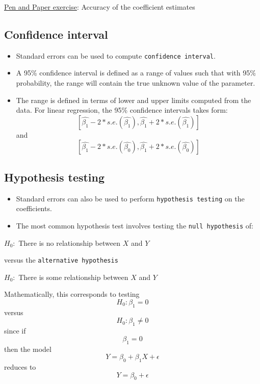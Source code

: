 \documentclass[]{article}
\providecommand{\tightlist}{%
  \setlength{\itemsep}{0pt}\setlength{\parskip}{0pt}}
\begin{document}
\href{pen-and-paper-plasma-volume.pdf}{Pen and Paper exercise}: Accuracy
of the coefficient estimates

\hypertarget{confidence-interval}{%
\subsection{Confidence interval}\label{confidence-interval}}

\begin{itemize}
\tightlist
\item
  Standard errors can be used to compute \texttt{confidence\ interval}.
\item
  A 95\% confidence interval is defined as a range of values such that
  with 95\% probability, the range will contain the true unknown value
  of the parameter.
\item
  The range is defined in terms of lower and upper limits computed from
  the data. For linear regression, the 95\% confidence intervals takes
  form:
  \[[\hat{\beta_1}-2*s.e.(\hat{\beta_1}), \hat{\beta_1}+2*s.e.(\hat{\beta_1})]\]
  and
  \[[\hat{\beta_1}-2*s.e.(\hat{\beta_0}), \hat{\beta_1}+2*s.e.(\hat{\beta_0})]\]
\end{itemize}

\hypertarget{hypothesis-testing-1}{%
\subsection{Hypothesis testing}\label{hypothesis-testing-1}}

\begin{itemize}
\tightlist
\item
  Standard errors can also be used to perform
  \texttt{hypothesis\ testing} on the coefficients.
\item
  The most common hypothesis test involves testing the
  \texttt{null\ hypothesis} of: \newline
\end{itemize}

\(H_0:\) There is no relationship between \(X\) and \(Y\) \newline

versus the \texttt{alternative\ hypothesis} \newline

\(H_0:\) There is some relationship between \(X\) and \(Y\)

Mathematically, this corresponds to testing \[H_0: \beta_1=0\] versus
\[H_0: \beta_1\neq0\] since if \[\beta_1=0\] then the model
\[Y=\beta_0+\beta_1X + \epsilon\] reduces to \[Y=\beta_0 + \epsilon\]
\end{document}
